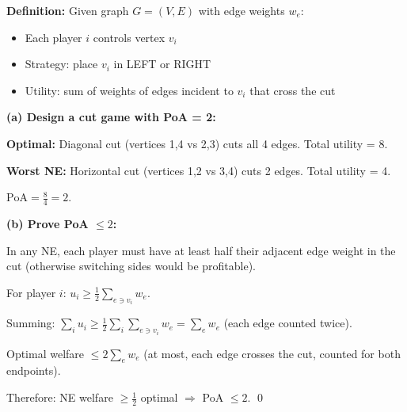 \begin{exbox}
\textbf{Definition:} Given graph $G = (V, E)$ with edge weights $w_e$:
\begin{itemize}
  \item Each player $i$ controls vertex $v_i$
  \item Strategy: place $v_i$ in LEFT or RIGHT
  \item Utility: sum of weights of edges incident to $v_i$ that cross the cut
\end{itemize}

\textbf{(a) Design a cut game with PoA = 2:}

\begin{center}
\end{center}

\textbf{Optimal:} Diagonal cut (vertices 1,4 vs 2,3) cuts all 4 edges. Total utility = 8.

\textbf{Worst NE:} Horizontal cut (vertices 1,2 vs 3,4) cuts 2 edges. Total utility = 4.

$\text{PoA} = \frac{8}{4} = 2$.

\textbf{(b) Prove PoA $\leq 2$:}

In any NE, each player must have at least half their adjacent edge weight in the cut (otherwise switching sides would be profitable).

For player $i$: $u_i \geq \frac{1}{2} \sum_{e \ni v_i} w_e$.

Summing: $\sum_i u_i \geq \frac{1}{2} \sum_i \sum_{e \ni v_i} w_e = \sum_e w_e$ (each edge counted twice).

Optimal welfare $\leq 2 \sum_e w_e$ (at most, each edge crosses the cut, counted for both endpoints).

Therefore: NE welfare $\geq \frac{1}{2}$ optimal $\Rightarrow$ PoA $\leq 2$. \qed
\end{exbox}

\bigseparator

